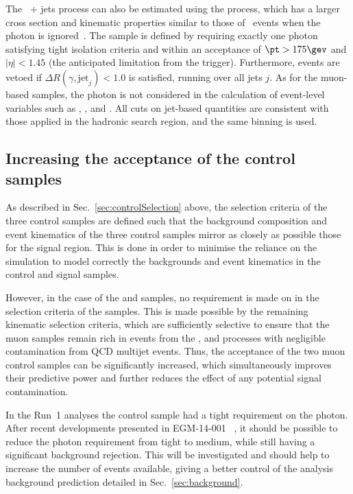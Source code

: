 The \znunu\ + jets process can also be estimated using the \gj
process, which has a larger cross section and kinematic properties
similar to those of \znunu\ events when the photon is
ignored~\cite{PAS-SUS-08-002,Bern:2011pa}. The \gj sample is defined
by requiring exactly one photon satisfying tight isolation criteria
and within an acceptance of $\pt > 175\gev$ and $|\eta| <
1.45$ (the anticipated limitation from the trigger). Furthermore, events are vetoed if $\Delta
R(\gamma,\textrm{jet}_j) < 1.0$ is satisfied, running over all jets
$j$. As for the muon-based samples, the photon is not considered in
the calculation of event-level variables such as \scalht, \mht, \met and 
\alphat. All cuts on jet-based quantities are consistent with those
applied in the hadronic search region, and the same \HT binning is
used. 

\subsection{Increasing the acceptance of the control samples\label{sec:larger}}

As described in Sec.~\ref{sec:controlSelection} above, the
selection criteria of the three control samples are defined such that
the background composition and event kinematics of the three control
samples mirror as closely as possible those for the signal
region. This is done in order to minimise the reliance on the
simulation to model correctly the backgrounds and event kinematics in
the control and signal samples.

However, in the case of the \mj and \mmj samples, no requirement is
made on \alphat in the selection criteria of the samples. This is made
possible by the remaining kinematic selection criteria, which are
sufficiently selective to ensure that the muon samples remain rich in
events from the \wj, \ttbar and \zmumu processes with negligible
contamination from QCD multijet events. Thus, the acceptance of the two 
muon control samples can be significantly increased, which simultaneously 
improves their predictive power and further reduces the effect of any potential
signal contamination. 

In the Run~1 analyses the \gj control sample had a tight requirement on the
photon. After recent developments presented in EGM-14-001~\cite{CMS-EGM-14-001}
, it
should be possible to reduce the photon requirement from tight to medium, while
still having a significant background rejection. This will be investigated and
should help to increase the number of events available, giving a better control
of the analysis background prediction detailed in Sec.~\ref{sec:background}.

